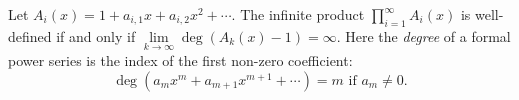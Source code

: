 

\setcounter{section}{3}
\setcounter{subsection}{4}
\setcounter{dfn}{8}

\begin{lem}
Let $A_i(x) = 1 + a_{i,1} x + a_{i,2} x^2 + \cdots$.
The infinite product $\prod_{i=1}^\infty A_i(x)$ is well-defined if and only if $\lim\limits_{k \to \infty} \deg (A_k(x) - 1) = \infty$.
Here the \emph{degree} of a formal power series is the index of the first non-zero coefficient:
\[
\deg (a_m x^m + a_{m+1} x^{m+1} + \cdots) = m \text{ if } a_m \ne 0.
\]
\end{lem}


